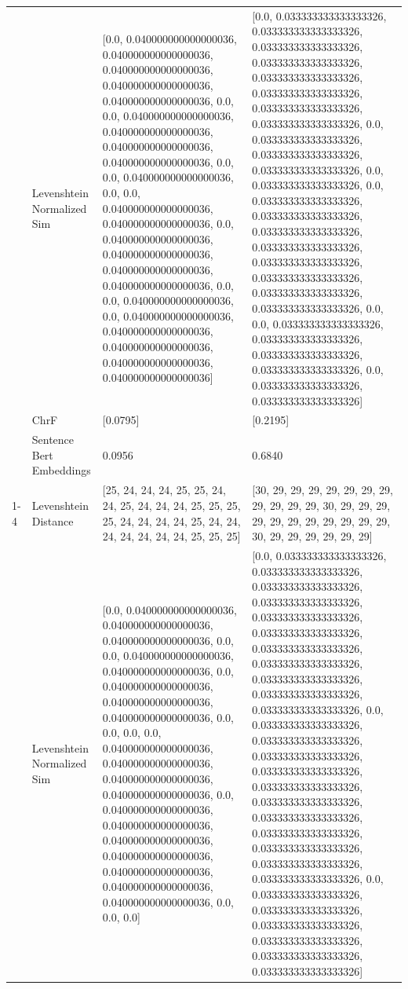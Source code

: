 \begin{tabular}{llll}
 & Levenshtein Normalized Sim & [0.0, 0.040000000000000036, 0.040000000000000036, 0.040000000000000036, 0.040000000000000036, 0.040000000000000036, 0.0, 0.0, 0.040000000000000036, 0.040000000000000036, 0.040000000000000036, 0.040000000000000036, 0.0, 0.0, 0.040000000000000036, 0.0, 0.0, 0.040000000000000036, 0.040000000000000036, 0.0, 0.040000000000000036, 0.040000000000000036, 0.040000000000000036, 0.040000000000000036, 0.0, 0.0, 0.040000000000000036, 0.0, 0.040000000000000036, 0.040000000000000036, 0.040000000000000036, 0.040000000000000036, 0.040000000000000036] & [0.0, 0.033333333333333326, 0.033333333333333326, 0.033333333333333326, 0.033333333333333326, 0.033333333333333326, 0.033333333333333326, 0.033333333333333326, 0.033333333333333326, 0.0, 0.033333333333333326, 0.033333333333333326, 0.033333333333333326, 0.0, 0.033333333333333326, 0.0, 0.033333333333333326, 0.033333333333333326, 0.033333333333333326, 0.033333333333333326, 0.033333333333333326, 0.033333333333333326, 0.033333333333333326, 0.033333333333333326, 0.0, 0.0, 0.033333333333333326, 0.033333333333333326, 0.033333333333333326, 0.033333333333333326, 0.0, 0.033333333333333326, 0.033333333333333326] \\
 & ChrF & [0.0795] & [0.2195] \\
 & Sentence Bert Embeddings & 0.0956 & 0.6840 \\
\cline{1-4}
\multirow[t]{4}{*}{Mundu muigwa ni muhootani} & Levenshtein Distance & [25, 24, 24, 24, 25, 25, 24, 24, 25, 24, 24, 24, 25, 25, 25, 25, 24, 24, 24, 24, 25, 24, 24, 24, 24, 24, 24, 24, 25, 25, 25] & [30, 29, 29, 29, 29, 29, 29, 29, 29, 29, 29, 29, 30, 29, 29, 29, 29, 29, 29, 29, 29, 29, 29, 29, 30, 29, 29, 29, 29, 29, 29] \\
 & Levenshtein Normalized Sim & [0.0, 0.040000000000000036, 0.040000000000000036, 0.040000000000000036, 0.0, 0.0, 0.040000000000000036, 0.040000000000000036, 0.0, 0.040000000000000036, 0.040000000000000036, 0.040000000000000036, 0.0, 0.0, 0.0, 0.0, 0.040000000000000036, 0.040000000000000036, 0.040000000000000036, 0.040000000000000036, 0.0, 0.040000000000000036, 0.040000000000000036, 0.040000000000000036, 0.040000000000000036, 0.040000000000000036, 0.040000000000000036, 0.040000000000000036, 0.0, 0.0, 0.0] & [0.0, 0.033333333333333326, 0.033333333333333326, 0.033333333333333326, 0.033333333333333326, 0.033333333333333326, 0.033333333333333326, 0.033333333333333326, 0.033333333333333326, 0.033333333333333326, 0.033333333333333326, 0.033333333333333326, 0.0, 0.033333333333333326, 0.033333333333333326, 0.033333333333333326, 0.033333333333333326, 0.033333333333333326, 0.033333333333333326, 0.033333333333333326, 0.033333333333333326, 0.033333333333333326, 0.033333333333333326, 0.033333333333333326, 0.0, 0.033333333333333326, 0.033333333333333326, 0.033333333333333326, 0.033333333333333326, 0.033333333333333326, 0.033333333333333326] \\

\end{tabular}
